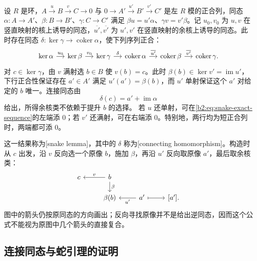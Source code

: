 \begin{theorem}[蛇引理]\label{b2:thm:snake-lemma}
	设 \(R\) 是环，\(A\xrightarrow{u}B\xrightarrow{v}C\to0\) 与 \(0\to A'\xrightarrow{u'}B'\xrightarrow{v'}C'\) 是左 \(R\) 模的正合列，同态 \(\alpha:A\to A'\)、\(\beta:B\to B'\)、\(\gamma:C\to C'\) 满足 \(\beta u=u'\alpha\)、\(\gamma v=v'\beta\)。记 \(u_0,v_0\) 为 \(u,v\) 在竖直映射的核上诱导的同态，\(\overline{u'},\overline{v'}\) 为 \(u',v'\) 在竖直映射的余核上诱导的同态。此时存在同态 \(\delta:\ker\gamma\to\operatorname{coker}\alpha\)，使下列序列正合：
	\begin{equation}\label{b2:eq:snake-exact-sequence}
		\begin{tikzcd}[column sep=1.2em]
			\ker\alpha\arrow[r,"u_0"]&\ker\beta\arrow[r,"v_0"]&\ker\gamma\arrow[r,"\delta"]&\operatorname{coker}\alpha\arrow[r,"\overline{u'}"]&\operatorname{coker}\beta\arrow[r,"\overline{v'}"]&\operatorname{coker}\gamma.
		\end{tikzcd}
	\end{equation}
	对 \(c\in\ker\gamma\)，由 \(v\) 满射选 \(b\in B\) 使 \(v(b)=c\)。此时 \(\beta(b)\in\ker v'=\operatorname{im}u'\)，下行正合性保证存在 \(a'\in A'\) 满足 \(u'(a')=\beta(b)\)，而 \(u'\) 单射保证这个 \(a'\) 对给定的 \(b\) 唯一。连接同态由
	\begin{equation}\label{b2:eq:snake-connecting-definition}
		\delta(c)=a'+\operatorname{im}\alpha
	\end{equation}
	给出，所得余核类不依赖于提升 \(b\) 的选择。 若 \(u\) 还单射，可在\eqref{b2:eq:snake-exact-sequence}的左端添 \(0\)；若 \(v'\) 还满射，可在右端添 \(0\)。特别地，两行均为短正合列时，两端都可添 \(0\)。
\end{theorem}

这一结果称为[snake lemma]，其中的 \(\delta\) 称为[connecting homomorphism]。构造时从 \(c\) 出发，沿 \(v\) 反向选一个原像 \(b\)，施加 \(\beta\)，再沿 \(u'\) 反向取原像 \(a'\)，最后取余核类：
\[
	\begin{tikzcd}[column sep=2.5em,row sep=1.5em]
		c&b\arrow[l,"v"']\arrow[d,"\beta"]&&\\
		&\beta(b)&a'\arrow[l,"u'"]\arrow[r,mapsto]&{[a']}.
	\end{tikzcd}
\]
图中的箭头仍按原同态的方向画出；反向寻找原像并不是给出逆同态，因而这个公式不能视为原图中几个箭头的直接复合。

\subsection{连接同态与蛇引理的证明}
\label{b2:subsec:0304:02}

